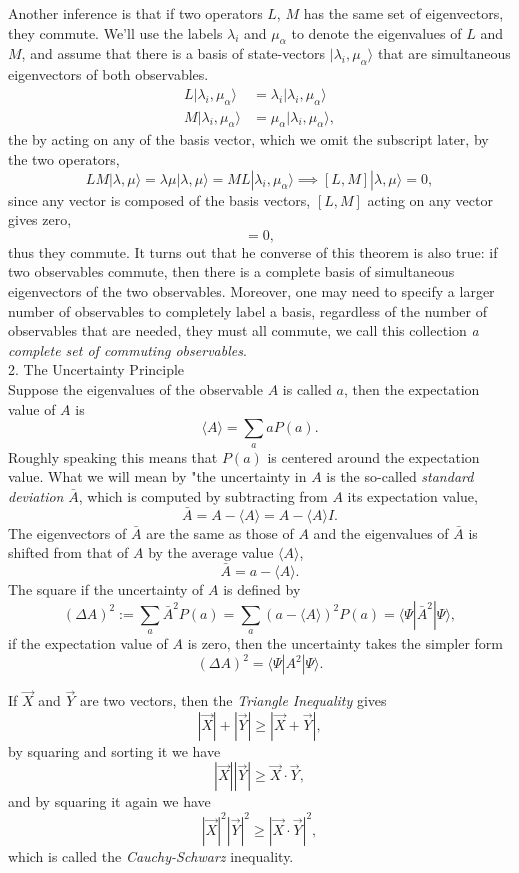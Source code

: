 \documentclass{article}
\newcommand{\be}{\begin{equation}}
\newcommand{\ee}{\end{equation}}
\newcommand{\bs}{\be\begin{split}}
\newcommand{\1}{\left}
\newcommand{\2}{\right}
\newcommand{\la}{\langle}
\newcommand{\ra}{\rangle}
\newcommand{\m}{\mu}
\newcommand{\al}{\alpha}
\newcommand{\lam}{\lambda}
\newcommand{\Del}{\Delta}
\begin{document}
Another inference is that if two operators $L$, $M$ has the same set of eigenvectors, they commute. We'll use the labels $\lam_i$ and $\m_\al$ to denote the eigenvalues of $L$ and $M$, and assume that there is a basis of state-vectors $|\lam_i,\m_\al\ra$ that are simultaneous eigenvectors of both observables.
\bs
L|\lam_i,\m_\al\ra&=\lam_i|\lam_i,\m_\al\ra\\
M|\lam_i,\m_\al\ra&=\m_\al|\lam_i,\m_\al\ra,
\end{split}\ee
the by acting on any of the basis vector, which we omit the subscript later, by the two operators,
\be
LM|\lam,\m\ra=\lam\m|\lam,\m\ra=ML|\lam_i,\m_\al\ra \implies [L,M]|\lam,\m\ra=0,
\ee
since any vector is composed of the basis vectors, $[L,M]$ acting on any vector gives zero,
\be [L,M]=0,\ee
thus they commute. It turns out that he converse of this theorem is also true: if two observables commute, then there is a complete basis of simultaneous eigenvectors of the two observables. Moreover, one may need to specify a larger number of observables to completely label a basis, regardless of the number of observables that are needed, they must all commute, we call this collection \textit{a complete set of commuting observables}.\\

2. The Uncertainty Principle\\

Suppose the eigenvalues of the observable $A$ is called $a$, then the expectation value of $A$ is
\be
\la A\ra= \sum_a aP(a).
\ee
Roughly speaking this means that $P(a)$ is centered around the expectation value. What we will mean by "the uncertainty in $A$ is the so-called \textit{standard deviation} $\bar A$, which is computed by subtracting from $A$ its expectation value,
\be
\bar A=A-\la A\ra=A-\la A\ra I.
\ee
The eigenvectors of $\bar A$ are the same as those of $A$ and the eigenvalues of $\bar A$ is shifted from that of $A$ by the average value $\la A\ra$,
\be
\bar A=a-\la A\ra.  
\ee
The square if the uncertainty of $A$ is defined by
\be
(\Del A)^2:=\sum_a \bar A^2 P(a)=\sum_a (a-\la A\ra)^2 P(a)=\la \Psi| \bar A^2|\Psi\ra,
\ee
if the expectation value of $A$ is zero, then the uncertainty takes the simpler form
\be
(\Del A)^2=\la \Psi| A^2|\Psi\ra.
\ee

If $\vec X$ and $\vec Y$ are two vectors, then the \textit{Triangle Inequality} gives
\be
|\vec X|+|\vec Y|\geqslant |\vec X+\vec Y|,
\ee
by squaring and sorting it we have
\be
|\vec X||\vec Y|\geqslant \vec X\cdot\vec Y,
\ee
and by squaring it again we have
\be
|\vec X|^2|\vec Y|^2\geqslant |\vec X\cdot\vec Y|^2,
\ee
which is called the \textit{Cauchy-Schwarz} inequality.
\end{document}
